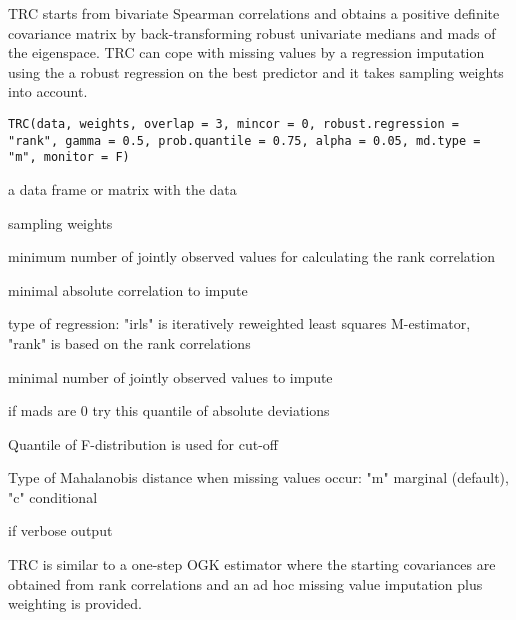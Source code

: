 %
\begin{Description}\relax
TRC starts from bivariate Spearman correlations and obtains a positive definite covariance matrix by 
back-transforming robust univariate medians and mads of the eigenspace. TRC can cope with missing values by a 
regression imputation using the a robust regression on the best predictor and it takes sampling weights into account.
\end{Description}
%
\begin{Usage}
\begin{verbatim}
TRC(data, weights, overlap = 3, mincor = 0, robust.regression = "rank", gamma = 0.5, prob.quantile = 0.75, alpha = 0.05, md.type = "m", monitor = F)
\end{verbatim}
\end{Usage}
%
\begin{Arguments}
\begin{ldescription}
\item[\code{data}] a data frame or matrix with the data
\item[\code{weights}] sampling weights
\item[\code{overlap}] minimum number of jointly observed values for calculating the rank correlation
\item[\code{mincor}] minimal absolute correlation to impute
\item[\code{robust.regression}] type of regression: "irls" is iteratively reweighted least squares M-estimator, "rank" is 
based on the rank correlations
\item[\code{gamma}] minimal number of jointly observed values to impute
\item[\code{prob.quantile}] if mads are 0 try this quantile of absolute deviations
\item[\code{alpha}]  Quantile of F-distribution is used for cut-off

\item[\code{md.type}] Type of Mahalanobis distance when missing values occur: "m" marginal (default), "c" conditional
\item[\code{monitor}] if  verbose output
\end{ldescription}
\end{Arguments}
%
\begin{Details}\relax
TRC is similar to a one-step OGK estimator where the starting covariances are obtained from rank correlations and an 
ad hoc missing value imputation plus weighting is provided.
\end{Details}
